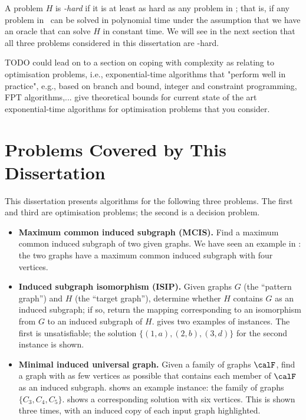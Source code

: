 A problem $H$ is \emph{\NP-hard} if it is at least as hard as any problem in \NP;
that is, if any problem in \NP\ can be solved in polynomial time under the assumption
that we have an oracle that can solve $H$ in constant time.  We will see in the next
section that all three problems considered in this dissertation are \NP-hard.

TODO could lead on to a section on coping with complexity as relating to optimisation problems, i.e., exponential-time algorithms that "perform well in practice", e.g., based on branch and bound, integer and constraint programming, FPT algorithms,...
give theoretical bounds for current state of the art exponential-time algorithms for optimisation problems that you consider.

\section{Problems Covered by This Dissertation}\label{sec:problems}

This dissertation presents algorithms for the following three problems.
The first and third are optimisation problems; the second
is a decision problem.

\begin{itemize}
    \item \textbf{Maximum common induced subgraph (MCIS).} Find
a maximum common induced subgraph of two given graphs.  We have seen an example
in : the two graphs have a maximum common induced subgraph
with four vertices.
    \item \textbf{Induced subgraph isomorphism (ISIP).} Given graphs $G$ (the ``pattern graph'')
    and $H$ (the ``target graph''),
determine whether $H$ contains $G$ as an induced subgraph;
if so, return the mapping corresponding to an isomorphism from $G$ to an
        induced subgraph of $H$.
     gives two examples of instances. The first is unsatisfiable;
        the solution $\{(1,a),(2,b), (3,d)\}$ for the second instance is shown.
    \item \textbf{Minimal induced universal graph.} Given a family of graphs $\calF$,
find a graph with as few vertices as possible that contains each member of $\calF$
as an induced subgraph.
     shows an example instance: the family
        of graphs $\{C_3, C_4, C_5\}$.  
     shows a corresponding solution with six vertices.
        This is shown three times, with an induced copy of each input graph
        highlighted.
\end{itemize}

